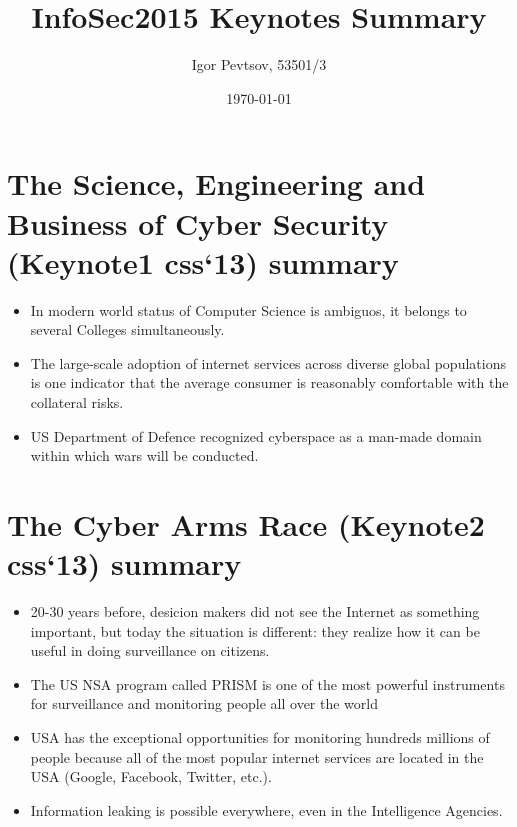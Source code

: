 \documentclass[14pt]{article}
\title{InfoSec2015 Keynotes Summary}
\date{\today}
\author{Igor Pevtsov, 53501/3}
\begin{document}
  	\maketitle

	\section{The Science, Engineering and Business of Cyber Security (Keynote1 css`13) summary}
	\begin{itemize}
	\item In modern world status of Computer Science is ambiguos, it belongs to several Colleges simultaneously.
	\item The large-scale adoption of internet services across diverse global populations is one indicator that the average consumer is reasonably comfortable with the collateral risks.
	\item US Department of Defence recognized cyberspace as a man-made domain within which wars will be conducted.
	\end{itemize}

	\section{The Cyber Arms Race (Keynote2 css`13) summary}
	\begin{itemize}
	\item 20-30 years before, desicion makers did not  see the Internet as something important, but today the situation is different: they realize how it can be useful in doing surveillance on citizens.
	\item The US NSA program called PRISM is one of the most powerful instruments for surveillance and monitoring people all over the world
	\item USA has the exceptional opportunities for monitoring hundreds millions of people because all of the most popular internet services are located in the USA (Google, Facebook, Twitter, etc.).
	\item Information leaking is possible everywhere, even in the Intelligence Agencies.
	\end{itemize}
\end{document}
